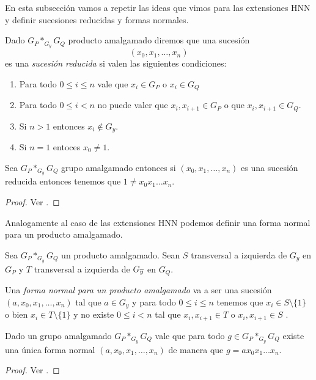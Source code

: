\documentclass[tesis.tex]{subfiles}
\begin{document}
En esta subsección vamos a repetir las ideas que vimos para las extensiones HNN y definir sucesiones reducidas y formas normales.

\begin{deff}\label{deff_amalgamado_fn}
	Dado $G_P \ast_{G_y} G_Q$ producto amalgamado diremos que una sucesión
	\[
	(x_0,x_1,\dots, x_n)
	\]
	es una \emph{sucesión reducida} si valen las siguientes condiciones:
	\begin{enumerate}
		\item Para todo $0 \le i \le n$ vale que $x_{i} \in G_{P}$ o $x_i \in G_Q$
		\item Para todo $0 \le i < n$ no puede valer que $x_i,x_{i+1} \in G_P$ o que $x_i,x_{i+1} \in G_Q$.
		\item Si $n > 1$ entonces $x_i \notin G_y$.
		\item Si $n = 1$ entoces $x_0 \neq 1$.
	\end{enumerate}
\end{deff}


\begin{teo}\label{coro_amalgamado_neq_1}
	Sea $G_P \ast_{G_y} G_Q$ grupo amalgamado entonces si $(x_0,x_1,\dots,x_n)$ es una sucesión reducida entonces tenemos que $1 \neq x_0x_1\dots x_n$.
\end{teo}
\begin{proof}
	Ver \cite[pp.187-188]{lyndon1977combinatorial}.
\end{proof}

Analogamente al caso de las extensiones HNN podemos definir una forma normal para un producto amalgamado.

\begin{deff}
	Sea $G_P \ast_{G_y} G_Q$ un producto amalgamado.
	Sean $S$ transversal a izquierda de $G_{y}$ en $G_P$ y $T$ transversal a izquierda de $G_{\overline y}$ en $G_{Q}$.
	
	Una \emph{forma normal para un producto amalgamado} va a ser una sucesión
	$(a,x_0,x_1,\dots, x_n)$ tal que $a \in G_{y}$ y para todo $0\le  i \le n$ tenemos que $x_{i} \in S \setminus \{ 1 \}$ o bien $x_{i} \in T \setminus \{ 1 \}$ y no 
	existe $ 0 \le i  < n$ tal que  $x_{i}, x_{i+1} \in T$ o $x_{i}, x_{i+1} \in S$ .	
\end{deff}

\begin{prop}\label{prop_amalgamado_formanormal}
	Dado un grupo amalgamado $G_P \ast_{G_y} G_Q$
	vale que para todo $g \in G_P \ast_{G_y} G_Q$ 
	existe una única forma normal $(a,x_0,x_1,\dots,x_n)$ de manera que $g= ax_0x_1\dots x_n$.
\end{prop}
\begin{proof}
	Ver \cite[p.187]{lyndon1977combinatorial}.
\end{proof}
 
\end{document}

